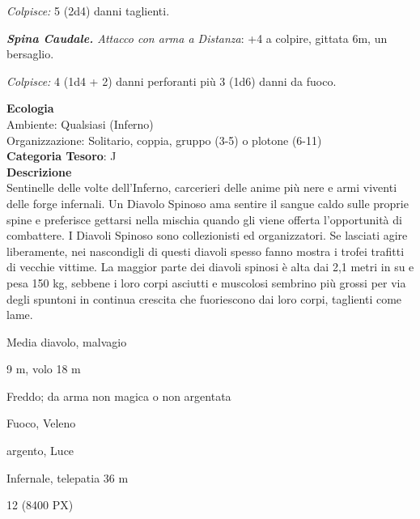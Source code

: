 \begin{multicols}{2}
{\emph{Colpisce:} 5 (2d4) danni taglienti.

\emph{\textbf{Spina Caudale.} Attacco con arma a Distanza}: +4 a colpire, gittata 6m, un bersaglio.

\emph{Colpisce:} 4 (1d4 + 2) danni perforanti più 3 (1d6) danni da fuoco.

\textbf{Ecologia}\\
Ambiente: Qualsiasi (Inferno)\\
Organizzazione: Solitario, coppia, gruppo (3-5) o plotone (6-11)\\
\textbf{Categoria Tesoro}: J\\
\textbf{Descrizione}\\
Sentinelle delle volte dell'Inferno, carcerieri delle anime più nere e armi viventi delle forge infernali. Un Diavolo Spinoso ama sentire il sangue caldo sulle proprie spine e preferisce gettarsi nella mischia quando gli viene offerta l'opportunità di combattere.
I Diavoli Spinoso sono collezionisti ed organizzatori. Se lasciati agire liberamente, nei nascondigli di questi diavoli spesso fanno mostra i trofei trafitti di vecchie vittime.
La maggior parte dei diavoli spinosi è alta dai 2,1 metri in su e pesa 150 kg, sebbene i loro corpi asciutti e muscolosi sembrino più grossi per via degli spuntoni in continua crescita che fuoriescono dai loro corpi, taglienti come lame.

\begin{description}[noitemsep, topsep=0pt, parsep=0pt, partopsep=0pt, itemsep=1pt, leftmargin=2.35cm,  labelwidth=2.2cm, itemindent=0cm, listparindent=0pt] %
\setlength{\baselineskip}{10pt}
\item[\textbf{Taglia/Tipo}] Media diavolo, malvagio
\item[\textbf{Caratt.}] 
\item[\textbf{Punti Ferita}] 
\item[\textbf{Movimento}] 9 m, volo 18 m
\item[\textbf{Tiri Salvez.}] 
\item[\textbf{Res. Danni}] Freddo; da arma non magica o non argentata
\item[\textbf{Imm. Danni}] Fuoco, Veleno
\item[\textbf{Vulnerabilità}] argento, Luce
\item[\textbf{Sensi}] 
\item[\textbf{Linguaggi}] Infernale, telepatia 36 m
\item[\textbf{Sfida}] 12 (8400 PX)
\end{description}
\smallskip

}
\end{multicols}
